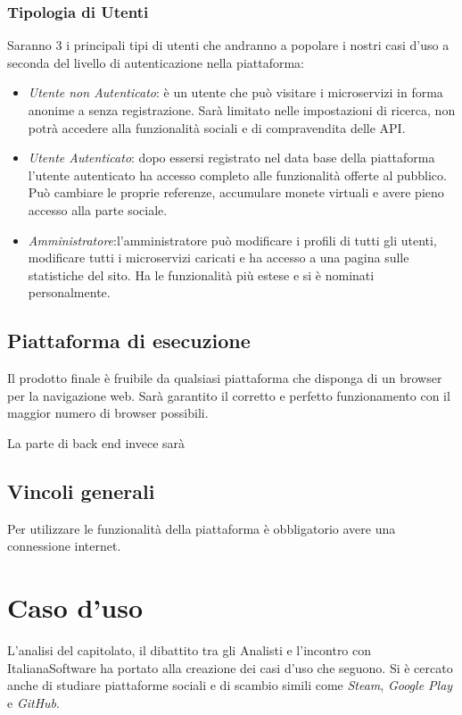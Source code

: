 \documentclass[12pt,a4paper,titlepage]{article}
\begin{document}
\subsubsection{Tipologia di Utenti}
Saranno 3 i principali tipi di utenti che andranno a popolare i nostri casi d'uso a seconda del livello di autenticazione nella piattaforma:
\begin{itemize}
	\item \textit{Utente non Autenticato}: è un utente che può visitare i microservizi in forma anonime a senza registrazione. Sarà limitato nelle impostazioni di ricerca, non potrà accedere alla funzionalità sociali e di compravendita delle API.
	\item \textit{Utente Autenticato}: dopo essersi registrato nel data base della piattaforma l'utente autenticato ha accesso completo alle funzionalità offerte al pubblico. Può cambiare le proprie referenze, accumulare monete virtuali e avere pieno accesso alla parte sociale. 
	\item \textit{Amministratore}:l'amministratore può modificare i profili di tutti gli utenti, modificare tutti i microservizi caricati e ha accesso a una pagina sulle statistiche del sito. Ha le funzionalità più estese e si è nominati personalmente. 
\end{itemize}

 

\subsection{Piattaforma di esecuzione}
Il prodotto finale è fruibile da qualsiasi piattaforma che disponga di un browser per la navigazione web. Sarà garantito il corretto e perfetto funzionamento con il maggior numero di browser possibili. 

La parte di back end invece sarà %
 
\subsection{Vincoli generali}
Per utilizzare le funzionalità della piattaforma è obbligatorio avere una connessione internet.
\newpage

\section{Caso d'uso}
L'analisi del capitolato, il dibattito tra gli Analisti e l'incontro con ItalianaSoftware ha portato alla creazione dei casi d'uso che seguono. Si è cercato anche di studiare piattaforme sociali e di scambio simili come \textit{Steam}, \textit{Google Play} e \textit{GitHub}.
\end{document}
